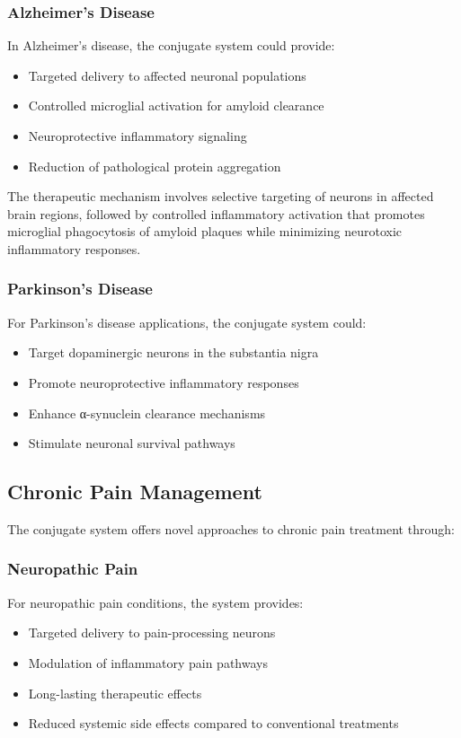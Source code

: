 \documentclass[11pt,a4paper]{article}
\begin{document}
\subsubsection{Alzheimer's Disease}

In Alzheimer's disease, the conjugate system could provide:
\begin{itemize}
\item Targeted delivery to affected neuronal populations
\item Controlled microglial activation for amyloid clearance
\item Neuroprotective inflammatory signaling
\item Reduction of pathological protein aggregation
\end{itemize}

The therapeutic mechanism involves selective targeting of neurons in affected brain regions, followed by controlled inflammatory activation that promotes microglial phagocytosis of amyloid plaques while minimizing neurotoxic inflammatory responses.

\subsubsection{Parkinson's Disease}

For Parkinson's disease applications, the conjugate system could:
\begin{itemize}
\item Target dopaminergic neurons in the substantia nigra
\item Promote neuroprotective inflammatory responses
\item Enhance α-synuclein clearance mechanisms
\item Stimulate neuronal survival pathways
\end{itemize}

\subsection{Chronic Pain Management}

The conjugate system offers novel approaches to chronic pain treatment through:

\subsubsection{Neuropathic Pain}

For neuropathic pain conditions, the system provides:
\begin{itemize}
\item Targeted delivery to pain-processing neurons
\item Modulation of inflammatory pain pathways
\item Long-lasting therapeutic effects
\item Reduced systemic side effects compared to conventional treatments
\end{itemize}
\end{document}
